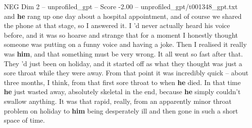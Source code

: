 \begin{textsample}{NEG Dim 2 – unprofiled\_gpt – Score -2.00 – unprofiled\_gpt/t001348\_gpt.txt}  \label{ex:f2_neg_027}
and \textbf{he} rang up one day about a hospital appointment, and of course we shared the phone at that stage, so I answered it.
I ’d never actually heard his voice before, and it was so hoarse and strange that for a moment I honestly thought someone was putting on a funny voice and having a joke.
Then I realised it really was \textbf{him}, and that something must be very wrong.
It all went so fast after that.
They ’d just been on holiday, and it started off as what they thought was just a sore throat while they were away.
From that point it was incredibly quick – about three months, I think, from that first sore throat to when \textbf{he} died.
In that time \textbf{he} just wasted away, absolutely skeletal in the end, because \textbf{he} simply couldn't swallow anything.
It was that rapid, really, from an apparently minor throat problem on holiday to \textbf{him} being desperately ill and then gone in such a short space of time.

\end{textsample}
